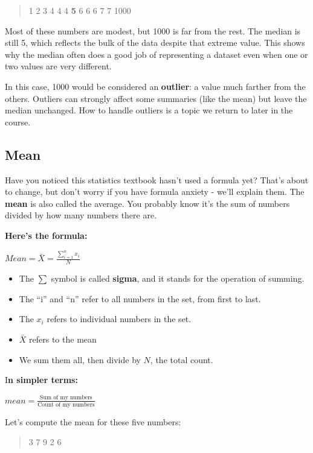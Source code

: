 \documentclass[
  letterpaper,
  DIV=11,
  numbers=noendperiod]{scrreprt}
\begin{document}
\begin{quote}
1 2 3 4 4 4 \textbf{5} 6 6 6 7 7 1000
\end{quote}

Most of these numbers are modest, but 1000 is far from the rest. The
median is still 5, which reflects the bulk of the data despite that
extreme value. This shows why the median often does a good job of
representing a dataset even when one or two values are very different.

In this case, 1000 would be considered an \textbf{outlier}: a value much
farther from the others. Outliers can strongly affect some summaries
(like the mean) but leave the median unchanged. How to handle outliers
is a topic we return to later in the course.

\subsection{Mean}\label{mean}

Have you noticed this statistics textbook hasn't used a formula yet?
That's about to change, but don't worry if you have formula anxiety -
we'll explain them. The \textbf{mean} is also called the average. You
probably know it's the sum of numbers divided by how many numbers there
are.

\textbf{Here's the formula:}

\(Mean = \bar{X} = \frac{\sum_{i=1}^{n} x_{i}}{N}\)

\begin{itemize}
\item
  The \(\sum\) symbol is called \textbf{sigma}, and it stands for the
  operation of summing.
\item
  The ``i'' and ``n'' refer to all numbers in the set, from first to
  last.
\item
  The \(x_{i}\) refers to individual numbers in the set.
\item
  \(\bar{X}\) refers to the mean
\item
  We sum them all, then divide by \(N\), the total count.
\end{itemize}

I\textbf{n simpler terms:}

\(mean = \frac{\text{Sum of my numbers}}{\text{Count of my numbers}}\)

Let's compute the mean for these five numbers:

\begin{quote}
3 7 9 2 6
\end{quote}
\end{document}
